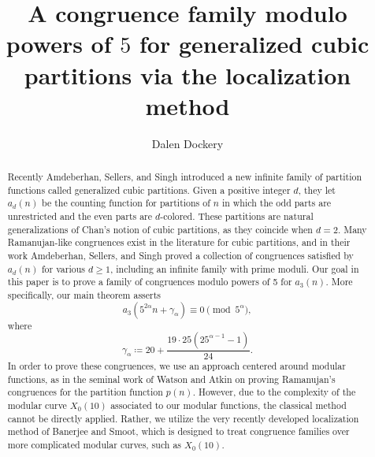 \documentclass[12pt, reqno]{amsart}
\title[Congruences for generalized cubic partitions via localization]{A congruence family modulo powers of $5$ for generalized cubic partitions via the localization method}
\author{Dalen Dockery}
\theoremstyle{definition}
\theoremstyle{remark}
\begin{document}
\begin{abstract}
Recently Amdeberhan, Sellers, and Singh introduced a new infinite family of partition functions called generalized cubic partitions. Given a positive integer $d$, they let $a_d(n)$ be the counting function for partitions of $n$ in which the odd parts are unrestricted and the even parts are $d$-colored. These partitions are natural generalizations of Chan's notion of cubic partitions, as they coincide when $d=2.$ Many Ramanujan-like congruences exist in the literature for cubic partitions, and in their work Amdeberhan, Sellers, and Singh proved a collection of congruences satisfied by $a_d(n)$ for various $d \geq 1$, including an infinite family with prime moduli.  Our goal in this paper is to prove a family of congruences modulo powers of 5 for $a_3(n)$. More specifically, our main theorem asserts
\[a_3\left(5^{2\alpha}n +\gamma_{\alpha} \right) \equiv 0 \pmod{5^\alpha},\]
where
\[\gamma_{\alpha} \coloneqq 20 + \frac{19 \cdot 25 (25^{\alpha-1}-1)}{24}.\]
In order to prove these congruences, we use an approach centered around modular functions, as in the seminal work of Watson and Atkin on proving Ramanujan's congruences for the partition function $p(n)$. However, due to the complexity of the modular curve $X_0(10)$ associated to our modular functions, the classical method cannot be directly applied. Rather, we utilize the very recently developed localization method of Banerjee and Smoot, which is designed to treat congruence families over more complicated modular curves, such as $X_0(10).$ 
\end{abstract}



\maketitle
\end{document}
